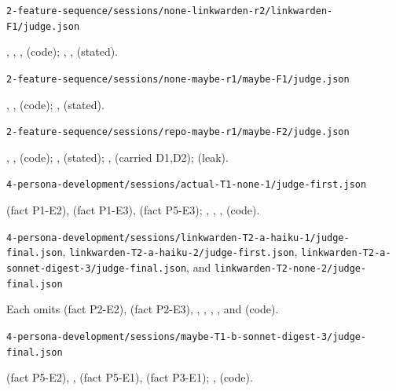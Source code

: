 {\small\raggedright

\par\medskip\noindent \nolinkurl{2-feature-sequence/sessions/none-linkwarden-r2/linkwarden-F1/judge.json}\par\nobreak\smallskip
{}, , ,  (code); , ,  (stated).

\par\medskip\noindent \nolinkurl{2-feature-sequence/sessions/none-maybe-r1/maybe-F1/judge.json}\par\nobreak\smallskip
{}, ,  (code); ,  (stated).

\par\medskip\noindent \nolinkurl{2-feature-sequence/sessions/repo-maybe-r1/maybe-F2/judge.json}\par\nobreak\smallskip
{}, ,  (code); ,  (stated); ,  (carried D1,D2);  (leak).

\par\medskip\noindent \nolinkurl{4-persona-development/sessions/actual-T1-none-1/judge-first.json}\par\nobreak\smallskip
{} (fact P1-E2),  (fact P1-E3),  (fact P5-E3); , , ,  (code).

\par\medskip\noindent \nolinkurl{4-persona-development/sessions/linkwarden-T2-a-haiku-1/judge-final.json}, \nolinkurl{linkwarden-T2-a-haiku-2/judge-first.json}, \nolinkurl{linkwarden-T2-a-sonnet-digest-3/judge-final.json}, and \nolinkurl{linkwarden-T2-none-2/judge-final.json}\par\nobreak\smallskip
Each omits  (fact P2-E2),  (fact P2-E3), , , , , and  (code).

\par\medskip\noindent \nolinkurl{4-persona-development/sessions/maybe-T1-b-sonnet-digest-3/judge-final.json}\par\nobreak\smallskip
{} (fact P5-E2), ,  (fact P5-E1),  (fact P3-E1); ,  (code).
\par}

